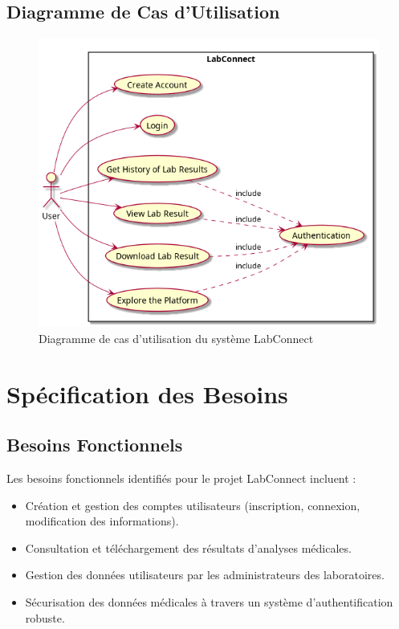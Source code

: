 \documentclass[12pt,a4paper]{report}
\begin{document}
\subsection{Diagramme de Cas d'Utilisation}
\begin{figure}[h]
\includegraphics[width=\textwidth]{./img/diagram/UseCases/global.png}
\caption{Diagramme de cas d'utilisation du système LabConnect}
\label{fig:use-case}
\end{figure}

\section{Spécification des Besoins}

\subsection{Besoins Fonctionnels}
Les besoins fonctionnels identifiés pour le projet LabConnect incluent :

\begin{itemize}
    \item Création et gestion des comptes utilisateurs (inscription, connexion, modification des informations).
    \item Consultation et téléchargement des résultats d'analyses médicales.
    \item Gestion des données utilisateurs par les administrateurs des laboratoires.
    \item Sécurisation des données médicales à travers un système d'authentification robuste.
\end{itemize}
\end{document}

